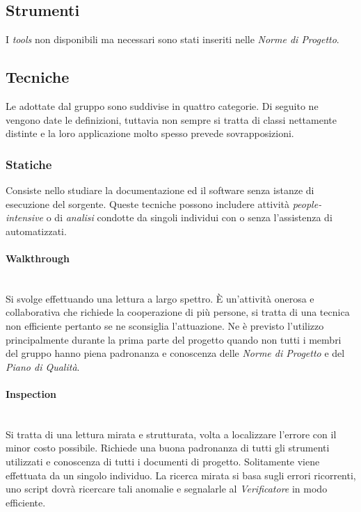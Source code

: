 	\subsection{Strumenti}
		I \emph{tools} non disponibili ma necessari sono stati inseriti nelle \emph{Norme di Progetto}. %
\fi

	\subsection{Tecniche}

	Le  adottate dal gruppo sono suddivise in quattro categorie. Di seguito ne vengono date le definizioni, tuttavia non sempre si tratta di classi nettamente distinte e la loro applicazione molto spesso prevede sovrapposizioni.
	
		\subsubsection{Statiche}

		Consiste nello studiare la documentazione ed il software senza istanze di esecuzione del sorgente. Queste tecniche possono includere attività \emph{people-intensive} o di \emph{analisi} condotte da singoli individui con o senza l'assistenza di  automatizzati.

			\paragraph{Walkthrough} \mbox{} \\
			
			Si svolge effettuando una lettura a largo spettro. È un'attività onerosa e collaborativa che richiede la cooperazione di più persone, si tratta di una tecnica non efficiente pertanto se ne sconsiglia l'attuazione. Ne è previsto l'utilizzo principalmente durante la prima parte del progetto quando non tutti i membri del gruppo hanno piena padronanza e conoscenza delle \emph{Norme di Progetto} e del \emph{Piano di Qualità}.

			\paragraph{Inspection} \mbox{} \\

			Si tratta di una lettura mirata e strutturata, volta a localizzare l'errore con il minor costo possibile. Richiede una buona padronanza di tutti gli strumenti utilizzati e conoscenza di tutti i documenti di progetto. Solitamente viene effettuata da un singolo individuo. La ricerca mirata si basa sugli errori ricorrenti, uno script dovrà ricercare tali anomalie e segnalarle al \emph{Verificatore} in modo efficiente.
			
